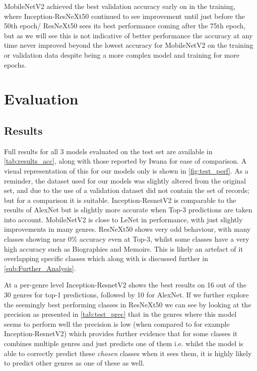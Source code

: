 \documentclass[12pt]{article}
\numberwithin{equation}{section}
\numberwithin{figure}{section}
\begin{document}
MobileNetV2 achieved the best validation accuracy early on in the training, where Inception-ResNeXt50 continued to see improvement until just before the 50th epoch/ ResNeXt50 sees its best performance coming after the 75th epoch, but as we will see this is not indicative of better performance the accuracy at any time never improved beyond the lowest accuracy for MobileNetV2 on the training or validation data despite being a more complex model and training for more epochs.


\section{Evaluation} 
\label{sec:Evaluation_and_Further_Exploration} 
\subsection{Results} 
\label{sub:Results} 
Full results for all 3 models evaluated on the test set are available in \cref{tab:results_acc}, along with those reported by Iwana for ease of comparison. A visual representation of this for our models only is shown in \cref{fig:test_perf}. As a reminder, the dataset used for our models was slightly altered from the original set, and due to the use of a validation dataset did not contain the set of records; but for a comparison it is suitable. Inception-ResnetV2 is comparable to the results of AlexNet but is slightly more accurate when Top-3 predictions are taken into account. MobileNetV2 is close to LeNet in performance, with just slightly improvements in many genres. ResNeXt50 shows very odd behaviour, with many classes showing near 0\% accuracy even at Top-3, whilst some classes have a very high accuracy such as Biographies and Memoirs. This is likely an artefact of it overlapping specific classes which along with is discussed further in \cref{sub:Further_Analysis}.

At a per-genre level Inception-ResnetV2 shows the best results on 16 out of the 30 genres for top-1 predictions, followed by 10 for AlexNet. If we further explore the seemingly best performing classes in ResNeXt50 we can see by looking at the precision as presented in \cref{tab:test_prec} that in the genres where this model seems to perform well the precision is low (when compared to for example Inception-ResnetV2) which provides further evidence that for some classes it combines multiple genres and just predicts one of them i.e. whilst the model is able to correctly predict these \emph{chosen}	classes when it sees them, it is highly likely to predict other genres as one of these as well.
\end{document}
